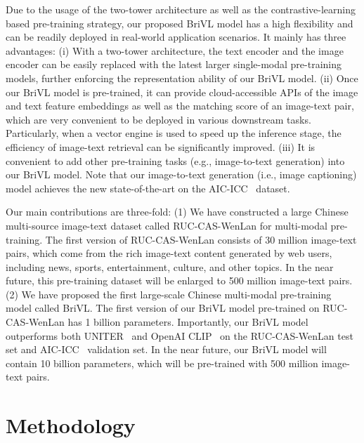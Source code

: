 \documentclass[10pt,twocolumn,letterpaper]{article}
\begin{document}
Due to the usage of the two-tower architecture as well as the contrastive-learning based pre-training strategy, our proposed BriVL model has a high flexibility and can be readily deployed in real-world application scenarios. It mainly has three advantages:
(i) With a two-tower architecture, the text encoder and the image encoder can be easily replaced with the latest larger single-modal pre-training models, further enforcing the representation ability of our BriVL model.
(ii) Once our BriVL model is pre-trained, it can provide cloud-accessible APIs of the image and text feature embeddings as well as the matching score of an image-text pair, which are very convenient to be deployed in various downstream tasks. Particularly, when a vector engine is used to speed up the inference stage, the efficiency of image-text retrieval can be significantly improved.
(iii) It is convenient to add other pre-training tasks (e.g., image-to-text generation) into our BriVL model. Note that our image-to-text generation (i.e., image captioning) model achieves the new state-of-the-art on the AIC-ICC~\cite{wu2017ai}  dataset.

Our main contributions are three-fold: (1) We have constructed a large Chinese multi-source image-text dataset called RUC-CAS-WenLan for multi-modal pre-training. The first version of RUC-CAS-WenLan consists of 30 million image-text pairs, which come from the rich image-text content generated by web users, including news, sports, entertainment, culture, and other topics. In the near future, this pre-training dataset will be enlarged to 500 million image-text pairs. (2) We have proposed the first large-scale Chinese multi-modal pre-training model called BriVL. The first version of our BriVL model pre-trained on RUC-CAS-WenLan has 1 billion parameters. Importantly, our BriVL model outperforms both UNITER~\cite{chen2020uniter} and OpenAI CLIP~\cite{radford2021learning} on the RUC-CAS-WenLan test set and AIC-ICC~\cite{wu2017ai} validation set. In the near future, our BriVL model will contain 10 billion parameters, which will be pre-trained with 500 million image-text pairs.

\vspace{-0.2cm}
\section{Methodology}
\label{sec:cmp}
\end{document}
